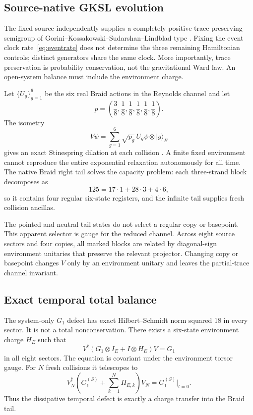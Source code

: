 \documentclass[11pt]{article}
\theoremstyle{definition}
\theoremstyle{remark}
\begin{document}
\subsection{Source-native GKSL evolution}

The fixed source independently supplies a completely positive trace-preserving semigroup of Gorini--Kossakowski--Sudarshan--Lindblad type \cite{gorini1976,lindblad1976}. Fixing the event clock rate~\eqref{eq:eventrate} does not determine the three remaining Hamiltonian controls; distinct generators share the same clock. More importantly, trace preservation is probability conservation, not the gravitational Ward law. An open-system balance must include the environment charge.

Let $\{U_g\}_{g=1}^{6}$ be the six real Braid actions in the Reynolds channel and let
\begin{equation}
 p=\left(\frac38,\frac18,\frac18,\frac18,\frac18,\frac18\right).
\end{equation}
The isometry
\begin{equation}\label{eq:stinespring}
 V\psi=\sum_{g=1}^{6}\sqrt{p_g}\,U_g\psi\otimes|g\rangle_E
\end{equation}
gives an exact Stinespring dilation at each collision \cite{stinespring1955}. A finite fixed environment cannot reproduce the entire exponential relaxation autonomously for all time. The native Braid right tail solves the capacity problem: each three-strand block decomposes as
\begin{equation}
 125=17\cdot1+28\cdot3+4\cdot6,
\end{equation}
so it contains four regular six-state registers, and the infinite tail supplies fresh collision ancillas.

The pointed and neutral tail states do not select a regular copy or basepoint. This apparent selector is gauge for the reduced channel. Across eight source sectors and four copies, all marked blocks are related by diagonal-sign environment unitaries that preserve the relevant projector. Changing copy or basepoint changes $V$ only by an environment unitary and leaves the partial-trace channel invariant.

\subsection{Exact temporal total balance}

The system-only $G_1$ defect has exact Hilbert--Schmidt norm squared 18 in every sector. It is not a total nonconservation. There exists a six-state environment charge $H_E$ such that
\begin{equation}\label{eq:g1balance}
 V^{\dagger}(G_1\otimes I_E+I\otimes H_E)V=G_1
\end{equation}
in all eight sectors. The equation is covariant under the environment torsor gauge. For $N$ fresh collisions it telescopes to
\begin{equation}\label{eq:telescope}
 V_N^{\dagger}\left(G_1^{(S)}+\sum_{k=1}^{N}H_{E,k}\right)V_N
 =G_1^{(S)}\big|_{t=0}.
\end{equation}
Thus the dissipative temporal defect is exactly a charge transfer into the Braid tail.
\end{document}
